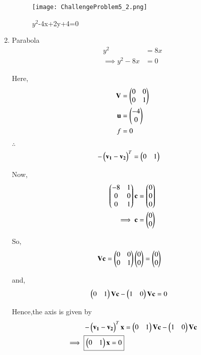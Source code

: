 \documentclass[journal,12pt,twocolumn]{IEEEtran}
\begin{document}
\begin{enumerate}
    \begin{figure}[!ht]
    \centering
    \texttt{[image: ChallengeProblem5\_2.png]}
    \caption{$y^2$-4x+2y+4=0}
    \label{ex2}	
    \end{figure}
    
    \item Parabola
    \begin{align}
        y^2 &= 8x
        \\
        \implies y^2-8x &= 0
    \end{align}
    
    Here,
    \begin{align}
    \mathbf{V} &= \begin{pmatrix}0 & 0 \\ 0 & 1\end{pmatrix} \\
    \mathbf{u} &= \begin{pmatrix}-4 \\ 0\end{pmatrix} \\
    f &= 0
    \end{align}

    $\therefore$
    \begin{align}
    -\begin{pmatrix}\mathbf{v_1}-\mathbf{v_2}\end{pmatrix}^T &= \begin{pmatrix}0 & 1\end{pmatrix}
    \end{align}

    Now,
    \begin{align}
    \begin{pmatrix}-8 & 1 \\ 0 & 0 \\ 0 & 1\end{pmatrix}\mathbf{c} &= \begin{pmatrix}0 \\ 0 \\ 0\end{pmatrix}
    \\
    \implies \mathbf{c} &= \begin{pmatrix}0 \\ 0\end{pmatrix}
    \end{align}

    So,
    \begin{align}
    \mathbf{V}\mathbf{c} &= \begin{pmatrix}0 & 0 \\ 0 & 1\end{pmatrix}\begin{pmatrix}0 \\ 0\end{pmatrix}=\begin{pmatrix}0 \\ 0\end{pmatrix}
    \end{align}

    and,
    \begin{align}
    \begin{pmatrix}0 & 1\end{pmatrix}\mathbf{V}\mathbf{c} - \begin{pmatrix}1&0\end{pmatrix}\mathbf{V}\mathbf{c} &= 0
    \end{align}

    Hence,the axis is given by
    \begin{align}
    -\begin{pmatrix}\mathbf{v_1}-\mathbf{v_2}\end{pmatrix}^T\mathbf{x} &= \begin{pmatrix}0 & 1\end{pmatrix}\mathbf{V}\mathbf{c} - \begin{pmatrix}1 & 0\end{pmatrix}\mathbf{V}\mathbf{c} \\
    \implies \boxed{\begin{pmatrix}0 & 1\end{pmatrix}\mathbf{x} = 0}
    \end{align}
    

\end{enumerate}
\end{document}
